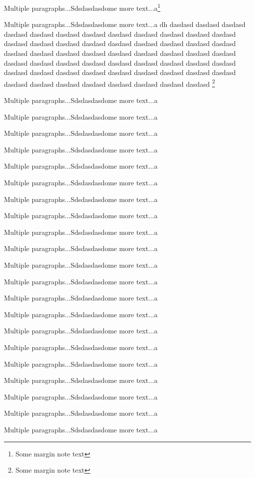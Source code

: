 \documentclass[doublespace,handout,marginnotes]{lingpaper}
\begin{document}
Multiple paragraphs...Sdsdasdasdome more text...a\footnote{Some margin note text}

Multiple paragraphs...Sdsdasdasdome more text...a dh dasdasd dasdasd dasdasd dasdasd dasdasd dasdasd dasdasd dasdasd dasdasd dasdasd dasdasd dasdasd dasdasd dasdasd dasdasd dasdasd dasdasd dasdasd dasdasd dasdasd dasdasd dasdasd dasdasd dasdasd dasdasd dasdasd dasdasd dasdasd dasdasd dasdasd dasdasd dasdasd dasdasd dasdasd dasdasd dasdasd dasdasd dasdasd dasdasd dasdasd dasdasd dasdasd dasdasd dasdasd dasdasd dasdasd dasdasd dasdasd dasdasd dasdasd dasdasd dasdasd dasdasd dasdasd dasdasd dasdasd \footnote{Some margin note text}

Multiple paragraphs...Sdsdasdasdome more text...a

Multiple paragraphs...Sdsdasdasdome more text...a

Multiple paragraphs...Sdsdasdasdome more text...a

Multiple paragraphs...Sdsdasdasdome more text...a

Multiple paragraphs...Sdsdasdasdome more text...a

Multiple paragraphs...Sdsdasdasdome more text...a

Multiple paragraphs...Sdsdasdasdome more text...a

Multiple paragraphs...Sdsdasdasdome more text...a

Multiple paragraphs...Sdsdasdasdome more text...a

Multiple paragraphs...Sdsdasdasdome more text...a

Multiple paragraphs...Sdsdasdasdome more text...a

Multiple paragraphs...Sdsdasdasdome more text...a

Multiple paragraphs...Sdsdasdasdome more text...a

Multiple paragraphs...Sdsdasdasdome more text...a

Multiple paragraphs...Sdsdasdasdome more text...a

Multiple paragraphs...Sdsdasdasdome more text...a

Multiple paragraphs...Sdsdasdasdome more text...a

Multiple paragraphs...Sdsdasdasdome more text...a

Multiple paragraphs...Sdsdasdasdome more text...a

Multiple paragraphs...Sdsdasdasdome more text...a

Multiple paragraphs...Sdsdasdasdome more text...a
\end{document}
